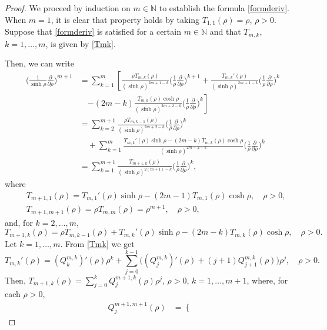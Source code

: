 \documentclass[10pt,a4paper]{amsart}
\begin{document}
\begin{proof}
We proceed by induction on $m\in \mathbb N$ to establish the formula \eqref{formderiv}. When $m=1$, it is clear that property holds by taking $T_{1,1}(\rho )=\rho $, $\rho >0$.
Suppose that \eqref{formderiv} is satisfied for a certain $m\in \mathbb N$ and that $T_{m,k}$, $k=1,\ldots, m$, is given by \eqref{Tmk}.

Then, we can write
\begin{align*}
 \Big(\frac{1}{\sinh \rho }\frac{\partial}{\partial \rho}\Big)^{m+1}&=\sum_{k=1}^m\left[\frac{\rho T_{m,k}(\rho )}{(\sinh \rho)^{2m+1-k}}\Big(\frac{1}{\rho }\frac{\partial }{\partial \rho} \Big)^{k+1}+ \frac{T_{m,k}'(\rho )}{(\sinh \rho)^{2m+1-k}}\Big(\frac{1}{\rho }\frac{\partial}{\partial \rho }\Big)^k\right.\\
 &\quad \left.-(2m-k)\frac{T_{m,k}(\rho )\cosh \rho }{(\sinh \rho)^{2m+2-k}}\Big(\frac{1}{\rho }\frac{\partial }{\partial \rho}\Big)^k\right]\\
 &=\sum_{k=2}^{m+1}\frac{\rho T_{m,k-1}(\rho )}{(\sinh \rho)^{2m+2-k}}\Big(\frac{1}{\rho }\frac{\partial }{\partial \rho}\Big)^k\\
 &\quad + \sum_{k=1}^m\frac{T_{m,k}'(\rho )\sinh \rho -(2m-k)T_{m,k}(\rho )\cosh \rho }{(\sinh \rho)^{2m+2-k}}\Big(\frac{1}{\rho}\frac{\partial}{\partial \rho}\Big)^k\\
 &=\sum_{k=1}^{m+1}\frac{T_{m+1,k}(\rho )}{(\sinh \rho )^{2(m+1)-k}}\Big(\frac{1}{\rho}\frac{\partial}{\partial \rho}\Big)^k,
\end{align*}
where
\begin{align}\label{T1}
&T_{m+1,1}(\rho )=T_{m,1}'(\rho )\sinh \rho -(2m-1)T_{m,1}(\rho )\cosh \rho,\quad \rho >0,\\
&T_{m+1,m+1}(\rho )=\rho T_{m,m}(\rho)=\rho ^{m+1},\quad \rho >0,\label{Tm}
\end{align}
and, for $k=2,\ldots, m$, 
\begin{equation}\label{Tk}
T_{m+1,k}(\rho )=\rho T_{m,k-1}(\rho )+T_{m,k}'(\rho )\sinh \rho -(2m-k)T_{m,k}(\rho )\cosh \rho,\quad \rho >0.
\end{equation}
Let $k=1,\ldots,m$. From \eqref{Tmk} we get
$$
T_{m,k}'(\rho )=(Q_k^{m,k})'(\rho )\rho ^k+\sum_{j=0}^{k-1}\big((Q_j^{m,k})'(\rho )+(j+1)Q_{j+1}^{m,k}(\rho )\big)\rho ^j,\quad \rho >0.
$$
Then, $T_{m+1,k}(\rho)=\sum_{j=0}^kQ_j^{m+1,k}(\rho )\rho ^j$, $\rho >0$, $k=1,\ldots, m+1$, where, for each $\rho >0$,
\begin{align}\label{Q11}
Q_j^{m+1,m+1}(\rho)&=\left\{
\begin{array}{ll}

\end{array}
\end{align}
\end{proof}
\end{document}
